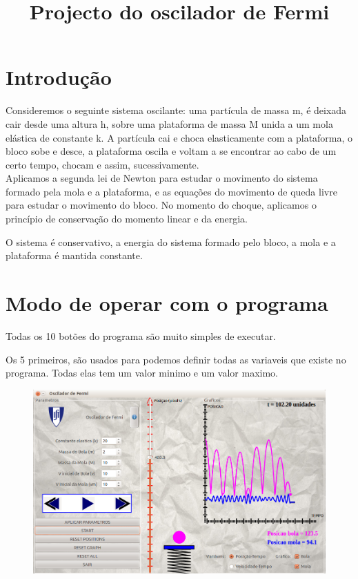 \documentclass[defaultstyle,12pt]{report}
\begin{document}
\title{Projecto do oscilador de Fermi}
\maketitle

\section{Introdução}

Consideremos o seguinte sistema oscilante: uma partícula de massa m, é deixada cair desde uma altura h, sobre uma plataforma de massa M unida a um mola elástica de constante k. A partícula cai e choca elasticamente com a plataforma, o bloco sobe e desce, a plataforma oscila e voltam a se encontrar ao cabo de um certo tempo, chocam e assim, sucessivamente.\\

Aplicamos a segunda lei de Newton para estudar o movimento do sistema formado pela mola e a plataforma, e as equações do movimento de queda livre para estudar o movimento do bloco. No momento do choque, aplicamos o princípio de conservação do momento linear e da energia.

O sistema é conservativo, a energia do sistema formado pelo bloco, a mola e a plataforma é mantida constante.

\section{Modo de operar com o programa}

Todas os 10 botões do programa são muito simples de executar.

Os 5 primeiros, são usados para podemos definir todas as variaveis que existe no programa. Todas elas tem um valor minimo e um valor maximo.



\begin{figure}[!htb]
\begin{center}
\includegraphics[scale=0.33]{programa.png}\\\
\end{center}
\end{figure}
\end{document}
